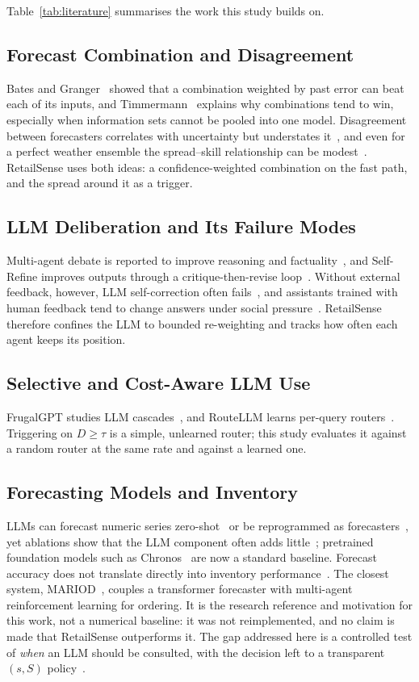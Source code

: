 \documentclass[conference]{IEEEtran}
\begin{document}
Table~\ref{tab:literature} summarises the work this study builds on.

\subsection{Forecast Combination and Disagreement}
Bates and Granger~\cite{bates1969} showed that a combination weighted by past error can beat each of
its inputs, and Timmermann~\cite{timmermann2006} explains why combinations tend to win, especially
when information sets cannot be pooled into one model. Disagreement between forecasters correlates
with uncertainty but understates it~\cite{zarnowitz1987}, and even for a perfect weather ensemble the
spread--skill relationship can be modest~\cite{whitaker1998}. RetailSense uses both ideas: a
confidence-weighted combination on the fast path, and the spread around it as a trigger.

\subsection{LLM Deliberation and Its Failure Modes}
Multi-agent debate is reported to improve reasoning and factuality~\cite{du2024}, and Self-Refine
improves outputs through a critique-then-revise loop~\cite{madaan2023}. Without external feedback,
however, LLM self-correction often fails~\cite{huang2024}, and assistants trained with human feedback
tend to change answers under social pressure~\cite{sharma2024}. RetailSense therefore confines the
LLM to bounded re-weighting and tracks how often each agent keeps its position.

\subsection{Selective and Cost-Aware LLM Use}
FrugalGPT studies LLM cascades~\cite{chen2023}, and RouteLLM learns per-query routers~\cite{ong2025}.
Triggering on $D\ge\tau$ is a simple, unlearned router; this study evaluates it against a random
router at the same rate and against a learned one.

\subsection{Forecasting Models and Inventory}
LLMs can forecast numeric series zero-shot~\cite{gruver2023} or be reprogrammed as
forecasters~\cite{jin2024}, yet ablations show that the LLM component often adds
little~\cite{tan2024}; pretrained foundation models such as Chronos~\cite{ansari2024} are now a
standard baseline. Forecast accuracy does not translate directly into inventory
performance~\cite{syntetos2010,kourentzes2020}. The closest system, MARIOD~\cite{yang2025}, couples a
transformer forecaster with multi-agent reinforcement learning for ordering. It is the research
reference and motivation for this work, not a numerical baseline: it was not reimplemented, and no
claim is made that RetailSense outperforms it. The gap addressed here
is a controlled test of \emph{when} an LLM should be consulted, with the decision left to a
transparent $(s,S)$ policy~\cite{silver2017}.
\end{document}

